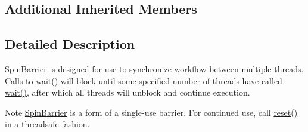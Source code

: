 \subsection*{Additional Inherited Members}


\subsection{Detailed Description}
\hyperlink{class_d_x_1_1_lock_free_1_1_spin_barrier}{Spin\-Barrier} is designed for use to synchronize workflow between multiple threads. Calls to \hyperlink{class_d_x_1_1_lock_free_1_1_spin_barrier_a869688c05d8edae270a0e549c36c163d}{wait()} will block until some specified number of threads have called \hyperlink{class_d_x_1_1_lock_free_1_1_spin_barrier_a869688c05d8edae270a0e549c36c163d}{wait()}, after which all threads will unblock and continue execution. 

\begin{DoxyNote}{Note}
\hyperlink{class_d_x_1_1_lock_free_1_1_spin_barrier}{Spin\-Barrier} is a form of a single-\/use barrier. For continued use, call \hyperlink{class_d_x_1_1_lock_free_1_1_spin_barrier_aea53e68d38677f716835dd5ad80279ba}{reset()} in a threadsafe fashion. 
\end{DoxyNote}


